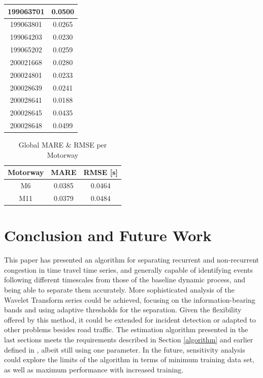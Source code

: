 \documentclass[a4paper, 10pt, conference]{ieeeconf}      %
\begin{document}
\begin{table}[htbp]
\begin{center}
\begin{tabular}{|c|c|}
			\hline
			199063701& 0.0500\\
			\hline
			199063801& 0.0265\\
			\hline
			199064203& 0.0230\\
			\hline
			199065202& 0.0259\\
			\hline
			200021668& 0.0280\\
			\hline
			200024801& 0.0233\\
			\hline
			200028639& 0.0241\\
			\hline
			200028641& 0.0188\\
			\hline
			200028645& 0.0435\\
			\hline
			200028648& 0.0499\\
			\hline
		\end{tabular}
		\label{tab1}
	\end{center}
	\label{table:m6mape}
\end{table}
\begin{table}[htbp]
	\caption{Global MARE \& RMSE per Motorway}
	\begin{center}
		\begin{tabular}{|c|c|c|}
			\hline
			\textbf{Motorway}&{\textbf{MARE}}&{\textbf{RMSE [s]}} \\
			\hline
			M6& 0.0385& 0.0464\\
			\hline
			M11& 0.0379& 0.0484\\
			\hline
		\end{tabular}
		\label{mapeglobal}
	\end{center}
\end{table}

\section{Conclusion and Future Work}
This paper has presented an algorithm for separating recurrent and non-recurrent congestion in time travel time series, and generally capable of identifying events following different timescales from those of the baseline dynamic process, and being able to separate them accurately.
More sophisticated analysis of the Wavelet Transform series could be achieved, focusing on the information-bearing bands and using adaptive thresholds for the separation.
Given the flexibility offered by this method, it could be extended for incident detection or adapted to other problems besides road traffic.
The estimation algorithm presented in the last sections meets the requirements described in Section \ref{algorithm} and earlier defined in \cite{ttprofiles}, albeit still using one parameter.
In the future, sensitivity analysis could explore the limits of the algorithm in terms of minimum training data set, as well as maximum performance with increased training.
\end{document}
